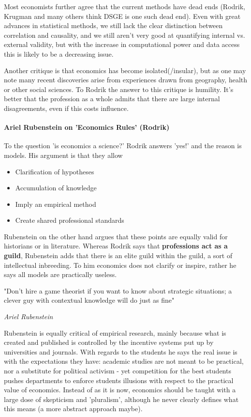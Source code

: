 \documentclass[12pt, a4paper]{article}
\begin{document}
\begin{multicols}{2}
Most economists further agree that the current methods have dead ends (Rodrik, Krugman and many others think DSGE is one such dead end). Even with great advances in statistical methods, we still lack the clear distinction between correlation and causality, and we still aren't very good at quantifying internal vs. external validity, but with the increase in computational power and data access this is likely to be a decreasing issue.

Another critique is that economics has become isolated(/insular), but as one may note many recent discoveries arise from experiences drawn from geography, health or other social sciences. To Rodrik the answer to this critique is humility. It's better that the profession as a whole admits that there are large internal disagreements, even if this costs influence. 

\paragraph{Ariel Rubenstein on 'Economics Rules' (Rodrik)} To the question 'is economics a science?' Rodrik answers 'yes!' and the reason is models. His argument is that they allow
\begin{itemize}
\item Clarification of hypotheses
\item Accumulation of knowledge
\item Imply an empirical method
\item Create shared professional standards
\end{itemize}
Rubenstein on the other hand argues that these points are equally valid for historians or in literature. Whereas Rodrik says that \textbf{professions act as a guild}, Rubenstein adds that there is an elite guild within the guild, a sort of intellectual inbreeding. To him economics does not clarify or inspire, rather he says all models are practically useless.
\epigraph{"Don't hire a game theorist if you want to know about strategic situations; a clever guy with contextual knowledge will do just as fine"}{\textit{Ariel Rubenstein}}
Rubenstein is equally critical of empirical research, mainly because what is created and published is controlled by the incentive systems put up by universities and journals. With regards to the students he says the real issue is with the expectations they have: academic studies are not meant to be practical, nor a substitute for political activism - yet competition for the best students pushes departments to enforce students illusions with respect to the practical value of economics. Instead of as it is now, economics should be taught with a large dose of skepticism and 'pluralism', although he never clearly defines what this means (a more abstract approach maybe).


\end{multicols}
\end{document}

